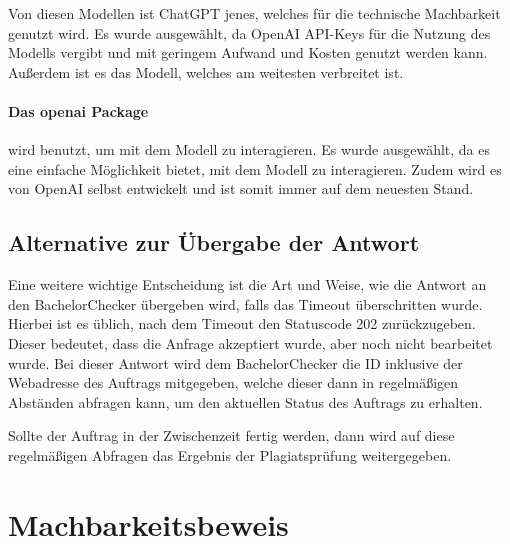 Von diesen Modellen ist ChatGPT jenes, welches für die technische Machbarkeit genutzt wird.
Es wurde ausgewählt, da OpenAI API-Keys für die Nutzung des Modells vergibt und mit geringem Aufwand und Kosten genutzt werden kann.
Außerdem ist es das Modell, welches am weitesten verbreitet ist.

\paragraph{Das openai Package} wird benutzt, um mit dem Modell zu interagieren.
Es wurde ausgewählt, da es eine einfache Möglichkeit bietet, mit dem Modell zu interagieren.
Zudem wird es von OpenAI selbst entwickelt und ist somit immer auf dem neuesten Stand.

\subsection{Alternative zur Übergabe der Antwort}\label{subsec:alternative-zur-uebergabe-der-antwort}
Eine weitere wichtige Entscheidung ist die Art und Weise, wie die Antwort an den BachelorChecker übergeben wird,
falls das Timeout überschritten wurde.
Hierbei ist es üblich, nach dem Timeout den Statuscode 202 zurückzugeben.
Dieser bedeutet, dass die Anfrage akzeptiert wurde, aber noch nicht bearbeitet wurde\autocite{mozilla}.
Bei dieser Antwort wird dem BachelorChecker die ID inklusive der Webadresse des Auftrags mitgegeben,
welche dieser dann in regelmäßigen Abständen abfragen kann, um den aktuellen Status des Auftrags zu erhalten.

Sollte der Auftrag in der Zwischenzeit fertig werden, dann wird auf diese regelmäßigen Abfragen das Ergebnis
der Plagiatsprüfung weitergegeben.


\section{Machbarkeitsbeweis}\label{sec:machbarkeitsbeweis}